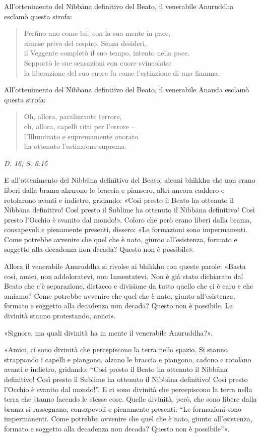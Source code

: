 All’ottenimento del Nibbāna definitivo del Beato, il venerabile
Anuruddha esclamò questa strofa:


\begin{quote}
Perfino uno come lui, con la sua mente in pace, \\
rimase privo del respiro. Senza desideri, \\
il Veggente completò il suo tempo, intento nella pace. \\
Sopportò le sue sensazioni con cuore svincolato: \\
la liberazione del suo cuore fu come l’estinzione di una fiamma.
\end{quote}

All’ottenimento del Nibbāna definitivo del Beato, il venerabile Ānanda
esclamò questa strofa:


\begin{quote}
Oh, allora, paralizzante terrore, \\
oh, allora, capelli ritti per l’orrore – \\
l’Illuminato e supremamente onorato \\
ha ottenuto l’estinzione suprema.
\end{quote}

\emph{D. 16; S. 6:15}


E all’ottenimento del Nibbāna definitivo del Beato, alcuni bhikkhu che
non erano liberi dalla brama alzarono le braccia e piansero, altri
ancora caddero e rotolarono avanti e indietro, gridando: «Così presto il
Beato ha ottenuto il Nibbāna definitivo! Così presto il Sublime ha
ottenuto il Nibbāna definitivo! Così presto l’Occhio è svanito dal
mondo!». Coloro che però erano liberi dalla brama, consapevoli e
pienamente presenti, dissero: «Le formazioni sono impermanenti. Come
potrebbe avvenire che quel che è nato, giunto all’esistenza, formato e
soggetto alla decadenza non decada? Questo non è possibile».


Allora il venerabile Anuruddha si rivolse ai bhikkhu con queste parole:
«Basta così, amici, non addoloratevi, non lamentatevi. Non è già stato
dichiarato dal Beato che c’è separazione, distacco e divisione da tutto
quello che ci è caro e che amiamo? Come potrebbe avvenire che quel che è
nato, giunto all’esistenza, formato e soggetto alla decadenza non
decada? Questo non è possibile. Le divinità stanno protestando, amici».


«Signore, ma quali divinità ha in mente il venerabile Anuruddha?».


«Amici, ci sono divinità che percepiscono la terra nello spazio. Si
stanno strappando i capelli e piangono, alzano le braccia e piangono,
cadono e rotolano avanti e indietro, gridando: “Così presto il Beato ha
ottenuto il Nibbāna definitivo! Così presto il Sublime ha ottenuto il
Nibbāna definitivo! Così presto l’Occhio è svanito dal mondo!”. E ci
sono divinità che percepiscono la terra nella terra che stanno facendo
le stesse cose. Quelle divinità, però, che sono libere dalla brama si
rassegnano, consapevoli e pienamente presenti: “Le formazioni sono
impermanenti. Come potrebbe avvenire che quel che è nato, giunto
all’esistenza, formato e soggetto alla decadenza non decada? Questo non
è possibile”».


